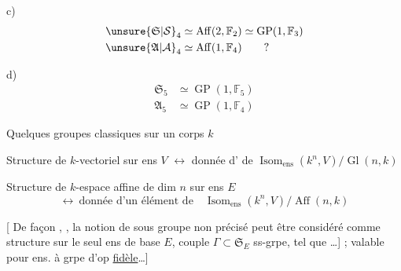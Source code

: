 c)
\[
\begin{aligned}
\unsure{\mathfrak{S}|\mathcal{S}}_4&\simeq\operatorname{Aff}(2,\mathbb{F}_2)\simeq\operatorname{GP}(1,\mathbb{F}_3)\\
\unsure{\mathfrak{A}|\mathcal{A}}_4&\simeq\operatorname{Aff}(1,\mathbb{F}_4)\qquad ?
\end{aligned}
\]

d)
\[
\begin{aligned}
\mathfrak{S}_5&\simeq\operatorname{GP}(1,\mathbb{F}_5)\\
\mathfrak{A}_5&\simeq\operatorname{GP}(1,\mathbb{F}_4)
\end{aligned}
\]

Quelques groupes classiques sur un corps $k$



Structure de $k$-vectoriel  sur ens $V$ $\longleftrightarrow$ donnée d'  de $\operatorname{Isom}_{\text{ens}}(k^n,V)/\operatorname{Gl}(n,k)$

Structure de $k$-espace affine de dim $n$ sur  ens $E$
\[
\longleftrightarrow\ \text{donnée d'un élément de}\quad
\operatorname{Isom}_{\text{ens}}(k^n,V)/\operatorname{Aff}(n,k)
\]

[ De façon , , la notion de  sous groupe non précisé peut être considéré comme structure sur le seul ens de base $E$,   couple $\Gamma\subset\mathfrak{S}_{E}$ ss-grpe, tel que \ldots ] ; valable pour ens. à grpe d'op \uline{fidèle}\ldots ]

